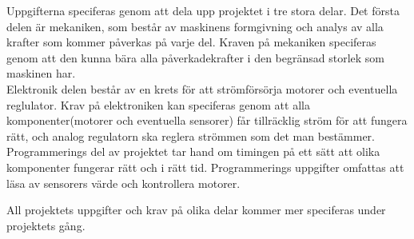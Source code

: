 Uppgifterna speciferas genom att dela upp projektet i tre stora delar. Det första delen är mekaniken, som består av maskinens formgivning och analys av alla krafter som kommer påverkas på varje del. Kraven på mekaniken speciferas genom att den kunna  bära  alla påverkadekrafter i den begränsad storlek som maskinen har.\\

Elektronik delen består av en krets för att strömförsörja motorer och eventuella reglulator. Krav på elektroniken kan speciferas genom att alla komponenter(motorer och eventuella sensorer) får tillräcklig ström för att fungera rätt, och analog regulatorn ska reglera strömmen som det man bestämmer.\\

Programmerings del av projektet tar hand om timingen på ett sätt att olika komponenter fungerar rätt och i rätt tid. Programmerings uppgifter omfattas att läsa av sensorers värde och kontrollera motorer.

All projektets uppgifter och krav på olika delar kommer mer speciferas under projektets gång.